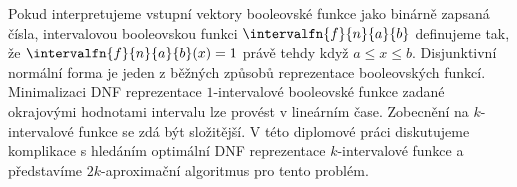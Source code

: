 Pokud interpretujeme vstupní vektory booleovské funkce
jako binárně zapsaná čísla,
intervalovou booleovskou funkci $\intervalfn{f}{n}{a}{b}$
definujeme tak,
že $\intervalfn{f}{n}{a}{b}(x) = 1$
právě tehdy když $a \leq x \leq b$.
Disjunktivní normální forma je
jeden z běžných způsobů reprezentace
booleovských funkcí.
Minimalizaci DNF reprezentace
$1$-intervalové booleovské funkce
zadané okrajovými hodnotami intervalu
lze provést v lineárním čase.
Zobecnění na $k$-intervalové funkce
se zdá být složitější.
V této diplomové práci diskutujeme komplikace s hledáním
optimální DNF reprezentace $k$-intervalové funkce
a představíme $2k$-aproximační algoritmus
pro tento problém.